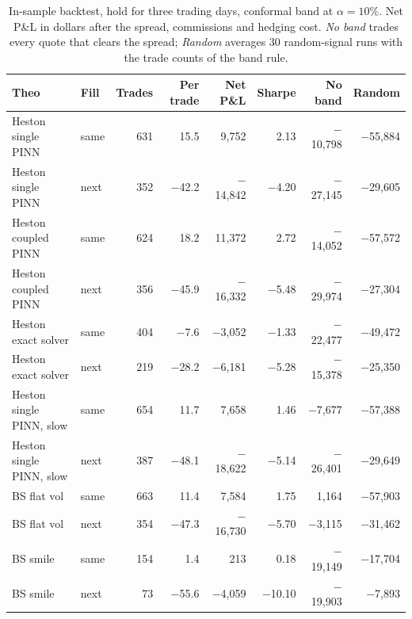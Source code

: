 \begin{table}[t]
\centering
\small
\caption{In-sample backtest, hold for three trading days, conformal band at $\alpha=10\%$. Net P\&L in dollars after the spread, commissions and hedging cost. \emph{No band} trades every quote that clears the spread; \emph{Random} averages 30 random-signal runs with the trade counts of the band rule.}
\label{tab:insample}
\begin{tabular}{llrrrrrr}
\toprule
Theo & Fill & Trades & Per trade & Net P\&L & Sharpe & No band & Random \\
\midrule
Heston single PINN & same & 631 & 15.5 & 9,752 & 2.13 & $-$10,798 & $-$55,884 \\
Heston single PINN & next & 352 & $-$42.2 & $-$14,842 & $-$4.20 & $-$27,145 & $-$29,605 \\
Heston coupled PINN & same & 624 & 18.2 & 11,372 & 2.72 & $-$14,052 & $-$57,572 \\
Heston coupled PINN & next & 356 & $-$45.9 & $-$16,332 & $-$5.48 & $-$29,974 & $-$27,304 \\
Heston exact solver & same & 404 & $-$7.6 & $-$3,052 & $-$1.33 & $-$22,477 & $-$49,472 \\
Heston exact solver & next & 219 & $-$28.2 & $-$6,181 & $-$5.28 & $-$15,378 & $-$25,350 \\
Heston single PINN, slow & same & 654 & 11.7 & 7,658 & 1.46 & $-$7,677 & $-$57,388 \\
Heston single PINN, slow & next & 387 & $-$48.1 & $-$18,622 & $-$5.14 & $-$26,401 & $-$29,649 \\
BS flat vol & same & 663 & 11.4 & 7,584 & 1.75 & 1,164 & $-$57,903 \\
BS flat vol & next & 354 & $-$47.3 & $-$16,730 & $-$5.70 & $-$3,115 & $-$31,462 \\
BS smile & same & 154 & 1.4 & 213 & 0.18 & $-$19,149 & $-$17,704 \\
BS smile & next & 73 & $-$55.6 & $-$4,059 & $-$10.10 & $-$19,903 & $-$7,893 \\
\bottomrule
\end{tabular}
\end{table}
